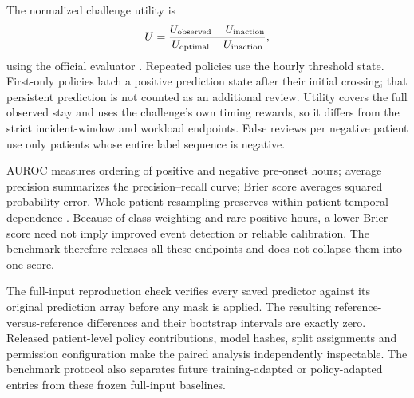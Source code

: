 The normalized challenge utility is
\[
 U=\frac{U_{\rm observed}-U_{\rm inaction}}
 {U_{\rm optimal}-U_{\rm inaction}},
\]
using the official evaluator \citep{reyna2020}. Repeated policies use the hourly threshold state. First-only policies latch a positive prediction state after their initial crossing; that persistent prediction is not counted as an additional review. Utility covers the full observed stay and uses the challenge's own timing rewards, so it differs from the strict incident-window and workload endpoints. False reviews per negative patient use only patients whose entire label sequence is negative.

AUROC measures ordering of positive and negative pre-onset hours; average precision summarizes the precision--recall curve; Brier score averages squared probability error. Whole-patient resampling preserves within-patient temporal dependence \citep{efron1979}. Because of class weighting and rare positive hours, a lower Brier score need not imply improved event detection or reliable calibration. The benchmark therefore releases all these endpoints and does not collapse them into one score.

The full-input reproduction check verifies every saved predictor against its original prediction array before any mask is applied. The resulting reference-versus-reference differences and their bootstrap intervals are exactly zero. Released patient-level policy contributions, model hashes, split assignments and permission configuration make the paired analysis independently inspectable. The benchmark protocol also separates future training-adapted or policy-adapted entries from these frozen full-input baselines.
